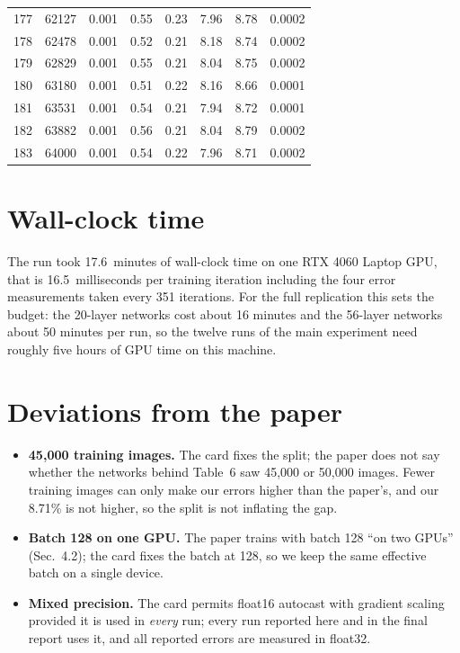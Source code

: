 \documentclass[11pt,a4paper]{article}
\begin{document}
\begin{center}
\begin{longtable}{@{}rrrrrrrr@{}}
177 & 62127 & 0.001 & 0.55 & 0.23 & 7.96 & 8.78 & 0.0002 \\
178 & 62478 & 0.001 & 0.52 & 0.21 & 8.18 & 8.74 & 0.0002 \\
179 & 62829 & 0.001 & 0.55 & 0.21 & 8.04 & 8.75 & 0.0002 \\
180 & 63180 & 0.001 & 0.51 & 0.22 & 8.16 & 8.66 & 0.0001 \\
181 & 63531 & 0.001 & 0.54 & 0.21 & 7.94 & 8.72 & 0.0001 \\
182 & 63882 & 0.001 & 0.56 & 0.21 & 8.04 & 8.79 & 0.0002 \\
183 & 64000 & 0.001 & 0.54 & 0.22 & 7.96 & 8.71 & 0.0002 \\
\end{longtable}
\end{center}

\section{Wall-clock time}

The run took 17.6\ minutes of wall-clock time on one RTX 4060 Laptop GPU,
that is 16.5\ milliseconds per training iteration including the four error
measurements taken every 351 iterations. For the full replication this sets the
budget: the 20-layer networks cost about 16 minutes and the 56-layer networks
about 50 minutes per run, so the twelve runs of the main experiment need
roughly five hours of GPU time on this machine.

\section{Deviations from the paper}

\begin{itemize}
\item \textbf{45{,}000 training images.} The card fixes the split; the paper
does not say whether the networks behind Table~6 saw 45{,}000 or 50{,}000
images. Fewer training images can only make our errors higher than the
paper's, and our 8.71\% is not higher, so the split is not inflating the gap.
\item \textbf{Batch 128 on one GPU.} The paper trains with batch 128 ``on two
GPUs'' (Sec.~4.2); the card fixes the batch at 128, so we keep the same
effective batch on a single device.
\item \textbf{Mixed precision.} The card permits float16 autocast with gradient
scaling provided it is used in \emph{every} run; every run reported here and in
the final report uses it, and all reported errors are measured in float32.
\end{itemize}
\end{document}
